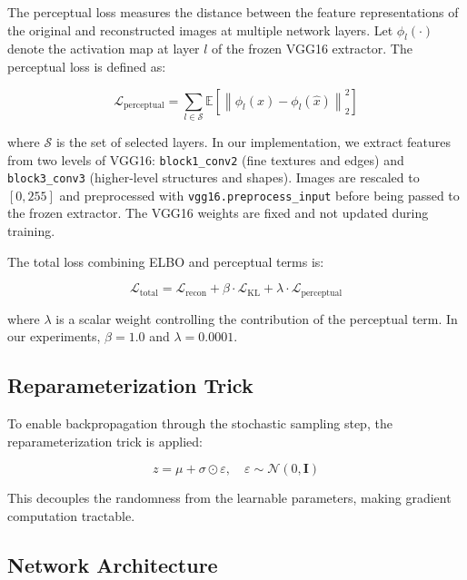 \documentclass[11pt,a4paper]{article}
\begin{document}
The perceptual loss measures the distance between the feature representations of the original and reconstructed images at multiple network layers. Let $\phi_l(\cdot)$ denote the activation map at layer $l$ of the frozen VGG16 extractor. The perceptual loss is defined as:

\begin{equation}
    \mathcal{L}_{\mathrm{perceptual}} = \sum_{l \in \mathcal{S}} \mathbb{E}\left[\left\| \phi_l(x) - \phi_l(\hat{x}) \right\|_2^2\right]
\end{equation}

where $\mathcal{S}$ is the set of selected layers. In our implementation, we extract features from two levels of VGG16: \texttt{block1\_conv2} (fine textures and edges) and \texttt{block3\_conv3} (higher-level structures and shapes). Images are rescaled to $[0, 255]$ and preprocessed with \texttt{vgg16.preprocess\_input} before being passed to the frozen extractor. The VGG16 weights are fixed and not updated during training.

The total loss combining ELBO and perceptual terms is:

\begin{equation}
    \mathcal{L}_{\mathrm{total}} = \mathcal{L}_{\mathrm{recon}} + \beta \cdot \mathcal{L}_{\mathrm{KL}} + \lambda \cdot \mathcal{L}_{\mathrm{perceptual}}
\end{equation}

where $\lambda$ is a scalar weight controlling the contribution of the perceptual term. In our experiments, $\beta = 1.0$ and $\lambda = 0.0001$.

\subsection{Reparameterization Trick}

To enable backpropagation through the stochastic sampling step, the reparameterization trick is applied:

\begin{equation}
    z = \mu + \sigma \odot \varepsilon, \quad \varepsilon \sim \mathcal{N}(0, \mathbf{I})
\end{equation}

This decouples the randomness from the learnable parameters, making gradient computation tractable.

\subsection{Network Architecture}
\end{document}
